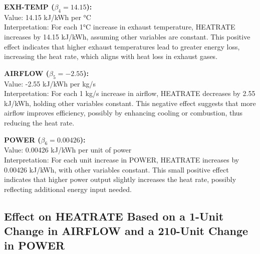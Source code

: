 \documentclass{article}
\begin{document}
\textbf{EXH-TEMP (\( \beta_4 = 14.15 \)):} \\
Value: 14.15 kJ/kWh per °C \\
Interpretation: For each 1°C increase in exhaust temperature, HEATRATE increases by 14.15 kJ/kWh, assuming other variables are constant. This positive effect indicates that higher exhaust temperatures lead to greater energy loss, increasing the heat rate, which aligns with heat loss in exhaust gases.

\textbf{AIRFLOW (\( \beta_5 = -2.55 \)):} \\
Value: -2.55 kJ/kWh per kg/s \\
Interpretation: For each 1 kg/s increase in airflow, HEATRATE decreases by 2.55 kJ/kWh, holding other variables constant. This negative effect suggests that more airflow improves efficiency, possibly by enhancing cooling or combustion, thus reducing the heat rate.

\textbf{POWER (\( \beta_6 = 0.00426 \)):} \\
Value: 0.00426 kJ/kWh per unit of power \\
Interpretation: For each unit increase in POWER, HEATRATE increases by 0.00426 kJ/kWh, with other variables constant. This small positive effect indicates that higher power output slightly increases the heat rate, possibly reflecting additional energy input needed.

\subsection*{Effect on HEATRATE Based on a 1-Unit Change in AIRFLOW and a 210-Unit Change in POWER}
\end{document}
